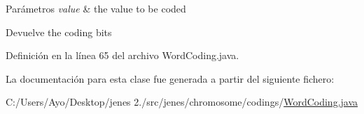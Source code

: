 \begin{DoxyParams}{Parámetros}
{\em value} & the value to be coded \\
\hline
\end{DoxyParams}
\begin{DoxyReturn}{Devuelve}
the coding bits 
\end{DoxyReturn}


Definición en la línea 65 del archivo Word\-Coding.\-java.



La documentación para esta clase fue generada a partir del siguiente fichero\-:\begin{DoxyCompactItemize}
\item 
C\-:/\-Users/\-Ayo/\-Desktop/jenes 2./src/jenes/chromosome/codings/\hyperlink{_word_coding_8java}{Word\-Coding.\-java}\end{DoxyCompactItemize}
